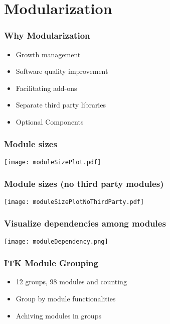 \section{Modularization}

\begin{frame}
\frametitle{Why Modularization}
\begin{itemize}
\item Growth management
\item Software quality improvement
\item Facilitating add-ons
\item Separate third party libraries
\item Optional Components
\end{itemize}
\end{frame}

\begin{frame}[plain]
\frametitle{Module sizes}
\center
\begin{center}
\texttt{[image: moduleSizePlot.pdf]}
\end{center}
\end{frame}

\begin{frame}[plain]
\frametitle{Module sizes (no third party modules)}
\center
\begin{center}
\texttt{[image: moduleSizePlotNoThirdParty.pdf]}
\end{center}
\end{frame}

\begin{frame}[plain]
\frametitle{Visualize dependencies among modules}
\center
\begin{center}
\texttt{[image: moduleDependency.png]}
\end{center}
\end{frame}


\begin{frame}
\frametitle{ITK Module Grouping}
\begin{itemize}
\item  12 groups, 98 modules and counting
\pause
\item  Group by module functionalities
\pause
\item  Achiving modules in groups
\pause
\end{itemize}
\end{frame}



